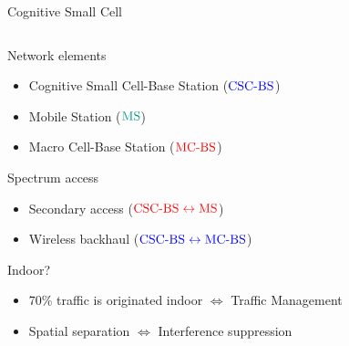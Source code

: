\documentclass[16pt]{beamer}
\newcommand{\fs}[2]{\fontsize{#1 pt}{#2}\selectfont}
\begin{document}
\begin{frame}[t]{Cognitive Small Cell}
		\vspace{-0.1cm}
		\fs{8}{8}
	\begin{columns}
	\begin{column}{0.37\columnwidth}
		\vspace{-0.1cm}
		\onslide<2->
		{	
			\begin{block}{\footnotesize Network elements}
				\begin{itemize}
					\item Cognitive Small Cell-Base Station ($\color{blue}{\text{CSC-BS}}$)
					\item Mobile Station ($\color{kit-green100}{\text{MS}}$) 
					\item Macro Cell-Base Station ($\color{red}{\text{MC-BS}}$) 
				\end{itemize}
			\end{block}
		}
		{
			\begin{block}{\footnotesize Spectrum access}
				\begin{itemize}
					\item Secondary access ($\color{red}{\text{CSC-BS} \leftrightarrow \text{MS}}$) 
					\item Wireless backhaul ($\color{blue}{\text{CSC-BS} \leftrightarrow \text{MC-BS}}$)
				\end{itemize}
			\end{block}
		}
		{
			\begin{block}{\footnotesize Indoor?}
				\begin{itemize}
					\item 70\% traffic is originated indoor $\Leftrightarrow$ Traffic Management
					\item Spatial separation $\Leftrightarrow$ Interference suppression	
				\end{itemize}
			\end{block}
		}
	\end{column}
	\begin{column}{0.63\columnwidth}
		\fs{8}{8}
		\begin{center}

\end{center}
\end{column}
\end{columns}
\end{frame}
\end{document}
